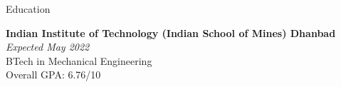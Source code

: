 \documentclass{resume} %
\begin{document}

\begin{rSection}{Education}

{\bf Indian Institute of Technology (Indian School of Mines) Dhanbad} \hfill {\em Expected May 2022} \\ 
BTech in Mechanical Engineering \\
Overall GPA: 6.76/10
\end{rSection}

\end{document}

